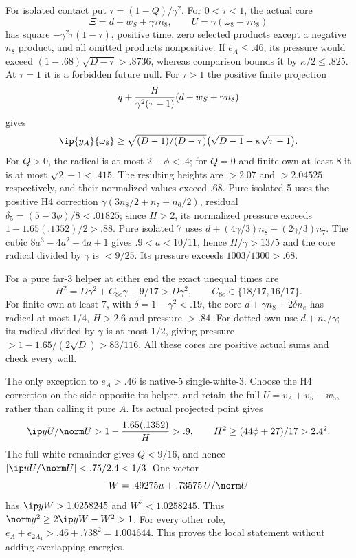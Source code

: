 For isolated contact put \(\tau=(1-Q)/\gamma^2\).
For \(0<\tau<1\), the actual core
\[
 \Xi=d+w_S+\gamma\tau n_8,\qquad
 U=\gamma(\omega_8-\tau n_8)
\]
has square \(-\gamma^2\tau(1-\tau)\), positive time,
zero selected products except a negative \(n_8\) product,
and all omitted products nonpositive.
If \(e_A\le.46\), its pressure would exceed
\((1-.68)\sqrt{D-\tau}>.8736\), whereas comparison bounds
it by \(\kappa/2\le.825\).
At \(\tau=1\) it is a forbidden future null.
For \(\tau>1\) the positive finite projection
\[
 q+{H\over\gamma^2(\tau-1)}
          (d+w_S+\gamma n_8)
\]
gives
\[
 \ip{y_A}{\omega_8}\ge
 \sqrt{(D-1)/(D-\tau)}
       \bigl(\sqrt{D-1}-\kappa\sqrt{\tau-1}\bigr).
\]
For \(Q>0\), the radical is at most \(2-\phi<.4\);
for \(Q=0\) and finite own at least 8 it is at most
\(\sqrt2-1<.415\).  The resulting heights are
\(>2.07\) and \(>2.04525\), respectively, and their normalized
values exceed \(.68\).
Pure isolated 5 uses the positive H4 correction
\(\gamma(3n_8/2+n_7+n_6/2)\), residual
\(\delta_5=(5-3\phi)/8<.01825\);
since \(H>2\), its normalized pressure exceeds
\(1-1.65(.1352)/2>.88\).
Pure isolated 7 uses \(d+(4\gamma/3)n_8+(2\gamma/3)n_7\).
The cubic \(8a^3-4a^2-4a+1\) gives
\(.9<a<10/11\), hence \(H/\gamma>13/5\) and the
core radical divided by \(\gamma\) is \(<9/25\).
Its pressure exceeds \(1003/1300>.68\).

For a pure far-3 helper at either end the exact unequal times are
\[
 H^2=D\gamma^2+C_{8e}\gamma-9/17>D\gamma^2,\qquad
 C_{8e}\in\{18/17,16/17\}.
\]
For finite own at least 7, with \(\delta=1-\gamma^2<.19\),
the core \(d+\gamma n_8+2\delta n_e\) has radical at most \(1/4\),
\(H>2.6\) and pressure \(>.84\).
For dotted own use \(d+n_8/\gamma\); its radical divided by
\(\gamma\) is at most \(1/2\), giving pressure
\(>1-1.65/(2\sqrt D)>83/116\).
All these cores are positive actual sums and check every wall.

The only exception to \(e_A>.46\) is native-5 single-white-3.
Choose the H4 correction on the side opposite its helper, and retain
the full \(U=v_A+v_S-w_5\), rather than calling it pure \(A\).
Its actual projected point gives
\[
 \ip y{U/\norm U}>
 1-{1.65(.1352)\over H}>.9,
 \qquad H^2\ge(44\phi+27)/17>2.4^2 .
\]
The full white remainder gives \(Q<9/16\), and hence
\(\lvert\ip u{U/\norm U}\rvert<.75/2.4<1/3\).
One vector
\[
 W=.49275u+.73575\,U/\norm U
\]
has \(\ip yW>1.0258245\) and \(W^2<1.0258245\).
Thus \(\norm y^2\ge2\ip yW-W^2>1\).
For every other role,
\(e_A+e_{2A_1}>.46+.738^2=1.004644\).
This proves the local statement without adding overlapping energies.

